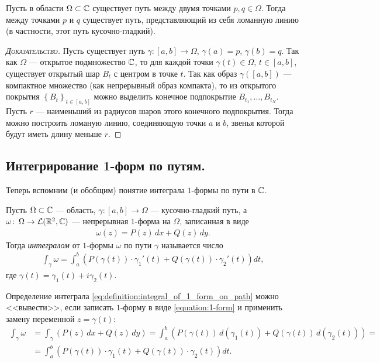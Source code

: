 \documentclass[../complex-analysis.tex]{subfiles}
\begin{document}
\begin{prop}
 \label{prop:smooth_path_existance}
 Пусть в области $ \Omega \subset \mathbb{C} $ существует путь между двумя точками $ p, q\in\Omega $. Тогда между точками $ p $ и $ q $ существует путь, представляющий из себя ломанную линию (в частности, этот путь кусочно-гладкий).
\end{prop}
\begin{proof}[\normalfont\textsc{Доказательство}]
 Пусть существует путь $ \gamma\colon[a,b]\to\Omega $, $ \gamma(a) = p $, $ \gamma(b)=q $. Так как $ \Omega $ --- открытое подмножество $ \mathbb{C} $, то для каждой точки $ \gamma(t) \in \Omega $, $ t \in [a,b] $, существует открытый шар $ B_t $ с центром в точке $ t $. Так как образ $ \gamma([a,b]) $ --- компактное множество (как непрерывный образ компакта), то из открытого покрытия $ \left\{B_t\right\}_{t \in [a,b]} $  можно выделить конечное подпокрытие $ B_{t_1}, \ldots, B_{t_N} $. Пусть $ r $ --- наименьший из радиусов шаров этого конечного подпокрытия. Тогда можно построить ломаную линию, соединяющую точки $ a $ и $ b $, звенья которой будут иметь длину меньше $ r $.
\end{proof}

\subsection{Интегрирование 1-форм по путям.}

Теперь вспомним (и обобщим) понятие интеграла $1$-формы по пути в $\mathbb{C}$.

\begin{df}
 Пусть $\Omega \subset \mathbb{C}$ --- область, $\gamma \colon [a,b] \to \Omega$ --- кусочно-гладкий путь, а $\omega \colon\, \Omega \to \mathcal{L}(\mathbb{R}^2, \mathbb{C})$ --- непрерывная $1$-форма на $ \Omega $, записанная в виде
 \begin{align*}
  \omega(z) = P(z)\,dx + Q(z)\,dy.
 \end{align*} Тогда \textit{интегралом} от $1$-формы $\omega$ по пути  $\gamma$ называется число
 \begin{align}
  \label{eq:definition:integral_of_1_form_on_path}
  \int_{\gamma} \omega = \int_{a}^{b} \left( P(\gamma(t)) \cdot \gamma_1'(t) + Q(\gamma(t)) \cdot \gamma_2'(t) \right) dt,
 \end{align} где $\gamma(t) = \gamma_1(t) + i \gamma_2(t)$.
\end{df}
\begin{remrk*}
 Определение интеграла \eqref{eq:definition:integral_of_1_form_on_path} можно <<вывести>>, если записать $ 1 $-форму в виде \eqref{equation:1-form} и применить замену переменной $ z = \gamma(t) $:
 \begin{align*}
  \int_{\gamma} \omega &= \int_{\gamma} \left( P(z)\,dx + Q(z)\,dy \right) = \int_{a}^{b} (P(\gamma(t)) \, d (\gamma_1(t)) + Q(\gamma(t)) \, d(\gamma_2(t))) = \\
  &= \int_{a}^{b} \left( P(\gamma(t)) \cdot \gamma_1(t) + Q(\gamma(t)) \cdot \gamma_2(t)\right)dt.
 \end{align*}
\end{remrk*}
\end{document}
